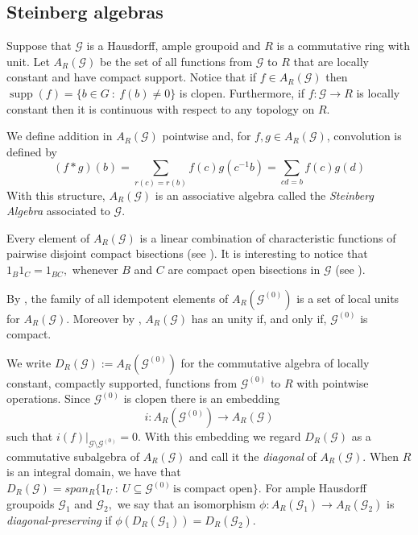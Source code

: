 \documentclass[11pt, a4paper]{amsart}
\newcommand{\G}{\ensuremath {\mathcal{G}}}
\newcommand{\Go}{\ensuremath {\mathcal{G}^{(0)}}}
\DeclareMathOperator{\supp}{supp}
\theoremstyle{plain}
\begin{document}


\subsection{Steinberg algebras}
Suppose that $\G$ is a Hausdorff, ample groupoid and $R$ is a commutative ring with unit. Let $A_R(\G)$ be the set of all functions from $\G$ to $R$ that are locally constant and have compact support. Notice that if $f \in A_R(\G)$ then
$\supp(f)=\{b \in G \ : \ f(b)\neq 0\}$ is clopen. Furthermore, if $f: \G \rightarrow R$ is locally constant then it is continuous with respect to any topology on $R.$

We define addition in $A_R(\G)$ pointwise and, for $f, g \in A_R(\G)$, convolution is defined by
\begin{equation}
(f * g)(b) = \sum_{r(c)=r(b)} f(c)g(c^{-1}b) = \sum_{cd=b}f(c)g(d)
\end{equation}
With this structure, $A_R(\G)$ is an associative algebra called the \emph{Steinberg Algebra} associated to $\G.$

Every element of $A_R(\G)$ is a linear combination of characteristic functions of pairwise disjoint compact bisections (see  \cite[Proposition~4.3]{Steinberg}). It is interesting to notice that $1_B1_C = 1_{BC},$ whenever $B$ and $C$ are compact open bisections in $\G$ (see \cite[Proposition~3.5(3)]{Steinberg}).

By \cite[Lemma~2.6]{Clark2}, the family of all idempotent elements of $A_R(\Go)$ is a set of local units for $A_R(\G).$ Moreover by \cite[Proposition~3.12.]{Steinberg}, $A_R(\G)$ has an unity if, and only if, $\Go$ is compact.

We write $D_R(\G):= A_R(\Go)$ for the commutative algebra of locally constant, compactly supported, functions from $\Go$ to $R$ with pointwise operations. Since $\Go$ is clopen there is an embedding 
\begin{equation}\label{embeddingdiagonal}
i : A_R(\Go)\rightarrow A_R(\G)
\end{equation}
such that $i(f)|_{\G \setminus \Go} =0.$ With this embedding we regard $D_R(\G)$ as a commutative subalgebra of $A_R(\G)$ and call it the \emph{diagonal} of $A_R(\G).$ When $R$ is an integral domain, we have that $D_R(\G)= span_R\{1_U \ : \ U \subseteq \Go \, \mbox{is compact open}\}.$ For ample Hausdorff groupoids $\G_1$ and $\G_2,$ we say that an isomorphism $\phi: A_R(\G_1) \to A_R(\G_2)$ is \emph{diagonal-preserving} if $\phi(D_R(\G_1))=D_R(\G_2).$
\end{document}
